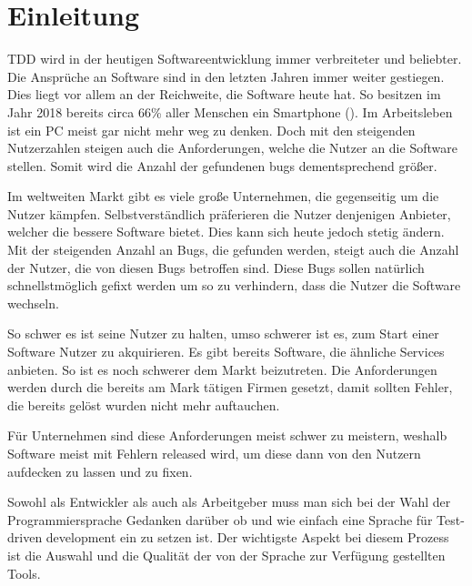 \section{Einleitung}\label{einleitung}

TDD wird in der heutigen Softwareentwicklung immer verbreiteter und beliebter.
Die Ansprüche an Software sind in den letzten Jahren immer weiter gestiegen.
Dies liegt vor allem an der Reichweite, die Software heute hat. So besitzen
im Jahr 2018 bereits circa 66\% aller Menschen ein Smartphone
(\cite{FraukeSchobelt:Smartphone}). Im Arbeitsleben ist ein PC meist gar nicht
mehr weg zu denken. Doch mit den steigenden Nutzerzahlen steigen auch die
Anforderungen, welche die Nutzer an die Software stellen. Somit wird die Anzahl
der gefundenen \Glspl{bug} dementsprechend größer.

Im weltweiten Markt gibt es viele große Unternehmen, die gegenseitig um die
Nutzer kämpfen. Selbstverständlich präferieren die Nutzer denjenigen Anbieter,
welcher die bessere Software bietet. Dies kann sich heute jedoch stetig ändern.
Mit der steigenden Anzahl an Bugs, die gefunden werden, steigt auch die Anzahl
der Nutzer, die von diesen Bugs betroffen sind. Diese Bugs sollen natürlich
schnellstmöglich gefixt werden um so zu verhindern, dass die Nutzer die Software
wechseln.

So schwer es ist seine Nutzer zu halten, umso schwerer ist es, zum Start einer
Software Nutzer zu akquirieren. Es gibt bereits Software, die ähnliche Services
anbieten. So ist es noch schwerer dem Markt beizutreten. Die Anforderungen
werden durch die bereits am Mark tätigen Firmen gesetzt, damit sollten Fehler,
die bereits gelöst wurden nicht mehr auftauchen.

Für Unternehmen sind diese Anforderungen meist schwer zu meistern, weshalb
Software meist mit Fehlern released wird, um diese dann von den Nutzern
aufdecken zu lassen und zu fixen.

Sowohl als Entwickler als auch als Arbeitgeber muss man sich bei der Wahl der
Programmiersprache Gedanken darüber ob und wie einfach eine Sprache für
Test-driven development ein zu setzen ist. Der wichtigste Aspekt bei diesem
Prozess ist die Auswahl und die Qualität der von der Sprache zur Verfügung
gestellten Tools.



